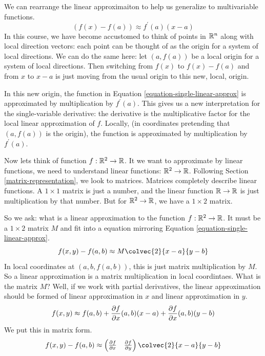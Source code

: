 \documentclass[fleqn,letterpaper]{report}
\begin{document}
We can rearrange the linear approximaiton to help us
generalize to multivariable functions. 
\begin{equation}
\label{equation-single-linear-approx}
(f(x) - f(a)) \approx f^\prime(a) (x-a)
\end{equation}
In this course, we have become accustomed to think of points in
$\mathbb{R}^n$ along with local direction vectors: each point can be
thought of as the origin for a system of local directions. We
can do the same here: let $(a,f(a))$ be a local origin for a
system of local directions. Then switching from $f(x)$ to
$f(x) - f(a)$ and from $x$ to $x-a$ is just moving from the
usual origin to this new, local, origin. 

In this new origin, the function in Equation
\ref{equation-single-linear-approx} is approximated by multiplication by
$f^\prime(a)$. This gives us a new interpretation for the
single-variable derivative: the derivative is the
multiplicative factor for the local linear approximation of
$f$. Locally, (in coordinates pretending that $(a,f(a))$ is
the origin), the function is approximated by multiplication by
$f^\prime(a)$. 

Now lets think of function $f: \mathbb{R}^2 \rightarrow \mathbb{R}$. It we
want to approximate by linear functions, we need to understand
linear functions: $\mathbb{R}^2 \rightarrow \mathbb{R}$. Following Section
\ref{matrix-representation}, we 
look to matrices. Matrices completely describe linear
functions. A $1 \times 1$ matrix is just a number, and the
linear function $\mathbb{R} \rightarrow \mathbb{R}$ is just multiplication
by that number. But for $\mathbb{R}^2 \rightarrow \mathbb{R}$, we have a $1
\times 2$ matrix. 

So we ask: what is a linear approximation to the function
$f: \mathbb{R}^2 \rightarrow \mathbb{R}$. It must be a $1 \times 2$ matrix
$M$ and fit into a equation mirroring Equation
\ref{equation-single-linear-approx}. 
\begin{equation*}
f(x,y) - f(a,b) \approx M \colvec{2}{x-a}{y-b} 
\end{equation*}
In local coordinates at $(a,b,f(a,b))$, this is just
matrix multiplication by $M$. So a linear approximation is a
matrix multiplication in local coordintaes. What is the
matrix $M$? Well, if we work with partial derivatives, the linear
approximation should be formed of linear approximation in $x$
and linear approximation in $y$.
\begin{equation*}
f(x,y) \approx f(a,b) + \frac{\partial f}{\partial x} (a,b) (x-a) +
\frac{\partial f}{\partial x} (a,b) (y-b)
\end{equation*}
We put this in matrix form.
\begin{equation*}
f(x,y) - f(a,b) \approx \left( \begin{matrix} \frac{\del
f}{\del x} & \frac{\del f}{\del y} \end{matrix} \right)
\colvec{2}{x-a}{y-b}
\end{equation*}
\end{document}

